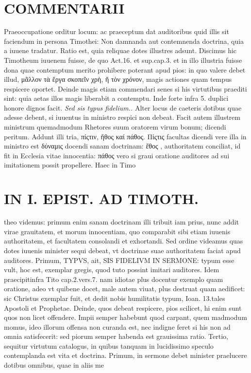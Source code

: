 \documentclass{article}
\begin{document}
\begin{pages}
\section*{COMMENTARII }
\marginpar{[ p.106 ]}\pstart Praeoccupatione orditur locum: ac praeceptum dat auditoribus quid illis sit faciendum in persona Timothei: Non damnanda aut contemnenda doctrina, quia a iuuene tradatur.  \pend\pstart Ratio est, quia reliquae dotes illustres adsunt. Discimus hic Timotheum iuuenem fuisse, de quo Act.16. et sup.cap.3. et in illo illustria fuisse dona quae contemptum merito prohibere poterant apud pios: in quo valere debet illud, μᾶλλον τὰ ἔργα σκοπεῖν χρὴ, ἤ τὸν χρόνον, magis actiones quam tempus respicere oportet. Deinde magis etiam commendari senes si his virtutibus praediti sint: quia aetas illos magis liberabit a contemptu. Inde forte infra 5. duplici honore dignos facit.  \pend
\textit{Sed sis typus fidelium.. }\pstart Alter locus de caeteris dotibus quae adesse debent, si iuuentus in ministro respici non debeat. Facit autem illustrem ministrum quemadmodum Rhetores suum oratorem virum bonum; dicendi peritum. Addunt illi tria, πίςτιν, ἤθος καί πάθος. Πίςτις facultas dicendi vere illa in ministro est δύναμις docendi sanam doctrinam:  ἔθος , authoritatem conciliat, id fit in Ecclesia vitae innocentia: πάθος vero si graui oratione auditores ad sui imitationem possit propellere. Haec in Timo\pend
\section*{IN I. EPIST. AD TIMOTH. }
\marginpar{[ p.107 ]}\pstart theo videmus: primum enim sanam doctrinam illi tribuit iam prius, nunc addit virae grauitatem, et morum innocentiam, quo comparabit sibi etiam iuuenis authoritatem, et facultatem consolandi et exhortandi.  \pend\pstart Sed ordine videamus quas dotes iuuenis minister sequi debeat, vt doctrinae suae authoritatem faciat apud auditores. Primum, TYPVS, ait, SIS FIDELIVM IN SERMONE: typum esse vult, hoc est, exemplar gregis, quod tuto possint imitari auditores. Idem praecipitinfra Tito cap.2.vers.7. nam idiotae plus docentur exemplo quam oratione, adeo vt quibene docet, male autem viuat, plus destruat quam aedificet: sic Christus exemplar fuit, et dedit nobis humilitatis typum, Ioan. 13.tales Apostoli et Prophetae.  \pend\pstart Deinde, quos debeat respicere, pios scilicet, hi enim sunt quos non licet offendere. Impii semper habebunt quod carpant, quem madmodum momus, ideo illorum offensa non curanda est, nec indigne feret si his non ad omnia satisfecerit: sed piorum semper habenda est grauissima ratio.  \pend\pstart Tertio, sequitur virtutum catalogus, in quibus tanquam in lucidissimo speculo contemplanda est vita et doctrina.  \pend\pstart Primum, in sermone debet minister praelucere dotibus omnibus, quae in aliis me\pend

\end{pages}
\end{document}
